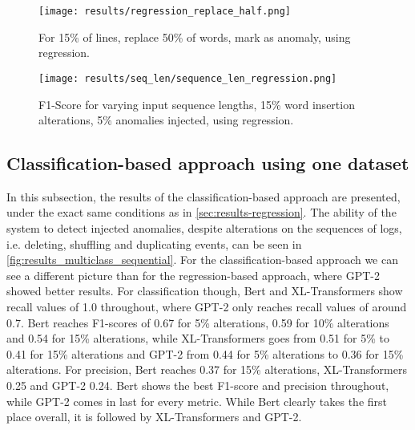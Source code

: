 
\begin{figure}[H]
  \centering
  \captionsetup{justification=centering}
  \texttt{[image: results/regression\_replace\_half.png]}\\
  \caption{For 15\% of lines, replace 50\% of words, mark as anomaly, using regression.}
  \label{fig:replace_words_regression}
\end{figure}

\begin{figure}[H]
  \centering
  \captionsetup{justification=centering}
  \texttt{[image: results/seq\_len/sequence\_len\_regression.png]}\\
  \caption{F1-Score for varying input sequence lengths, 15\% word insertion alterations, 5\% anomalies injected, using regression.}
  \label{fig:seq_len_regression}
\end{figure}




\newpage
\subsection{Classification-based approach using one dataset \label{sec:results-classification}}
In this subsection, the results of the classification-based approach are presented, under the exact same conditions as in \ref{sec:results-regression}. 
The ability of the system to detect injected anomalies, despite alterations on the sequences of logs, i.e. deleting, shuffling and duplicating events, can be seen in \ref{fig:results_multiclass_sequential}. For the classification-based approach we can see a different picture than for the regression-based approach, where GPT-2 showed better results. For classification though, Bert and XL-Transformers show recall values of 1.0 throughout, where GPT-2 only reaches recall values of around 0.7. Bert reaches F1-scores of 0.67 for 5\% alterations, 0.59 for 10\% alterations and 0.54 for 15\% alterations, while XL-Transformers goes from 0.51 for 5\% to 0.41 for 15\% alterations and GPT-2 from 0.44 for 5\% alterations to 0.36 for 15\% alterations. For precision, Bert reaches 0.37 for 15\% alterations, XL-Transformers 0.25 and GPT-2 0.24.
Bert shows the best F1-score and precision throughout, while GPT-2 comes in last for every metric. While Bert clearly takes the first place overall, it is followed by XL-Transformers and GPT-2.

